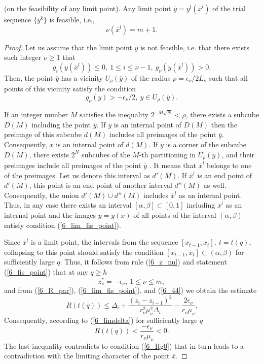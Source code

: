\begin{lemma} (on the feasibility of any limit point).
Any limit point $\overline{y}=y^l(\overline{x}^l)$  of the trial sequence $\{y^k\}$ is feasible, i.e., 
	\begin{equation}\label{6_rho}
	\nu(\overline{x}^l)=m+1.
	\end{equation}
\end{lemma} 
\begin{proof}
Let us assume that the limit point $\overline{y}$ is not feasible, i.e. that there exists such integer $\nu \geq 1$ that
\[
g_i(y(\overline{x}^l))\leq 0,\ 1\leq i\leq \nu - 1,\ g_\nu(y(\overline{x}^l))>0.
\]
Then, the point $\overline{y}$ has a vicinity $U_\rho(\overline{y})$ of the radius $\rho = \epsilon_\nu/2L_\nu$ such that all points of this vicinity satisfy the condition
	\begin{equation}\label{6_lim_fis_point}
	g_\nu(y) > -\epsilon_\nu/2, \ y \in U_\rho(\overline{y}).
	\end{equation}

If an integer number $M$ satisfies the inequality $2^{-M\sqrt{N}}<\rho$, there exists a subcube $D(M)$ including the point  $\overline{y}$. If $\overline{y}$ is an internal point of $D(M)$ then the preimage of this subcube $d(M)$ includes all preimages of the point $\overline{y}$. Consequently, $\overline{x}$ is an internal point of $d(M)$. 
If $\overline{y}$ is a corner of the subcube $D(M)$, there exists $2^N$ subcubes of the $M$-th  partitioning in $U_\rho(\overline{y})$, and their preimages include all preimages of the point $\overline{y}$ . 
It means that $\overline{x}^l$  belongs to one of the preimages. Let us denote this interval as  $d'(M)$. If $\overline{x}^l$ is an end point of $d'(M)$, this point is an end point of another interval $d''(M)$ as well. 
Consequently, the union $d'(M) \cup d''(M)$ includes $\overline{x}^l$ as an internal point. 
Thus, in any case there exists an interval $[\alpha,\beta] \subset [0,1] $ including $\overline{x}^l$ as an internal point and the images $y=y(x)$ of all points of the interval $(\alpha,\beta)$ satisfy condition (\ref{6_lim_fis_point}).

Since  $\overline{x}^l$  is a limit point, the intervals from the sequence $[x_{t-1},x_t],\ t=t(q)$, collapsing to this point should satisfy the condition $[x_{t-1},x_t] \subset (\alpha,\beta)$ for sufficiently large $q$. Thus, it follows from rule (\ref{6_z_nu}) and statement (\ref{6_fis_point}) that at any $q \geq h$
	\begin{equation}\label{6_44}
	z_\nu^\ast = -\epsilon_\nu,\ 1\leq\nu\leq m,
	\end{equation}
and from (\ref{6_R_par}), (\ref{6_lim_fis_point}), and (\ref{6_44}) we obtain the estimate 
\[
R(t(q)) \leq \Delta_i + \frac{(z_i - z_{i-1})^2}{r_\nu^2\mu_\nu^2\Delta_i}-\frac{2\epsilon_\nu}{r_\nu\mu_\nu}.
\]
Consequently, according to (\ref{6_limdelta}) for sufficiently large $q$
	\begin{equation}\label{6_45}
R(t(q)) < \frac{-\epsilon_\nu}{r_\nu\mu_\nu} < 0.
	\end{equation}
The last inequality contradicts to condition (\ref{6_Rg0}) that in turn leads to a contradiction with the limiting character of the point $\overline{x}$.
\end{proof}
